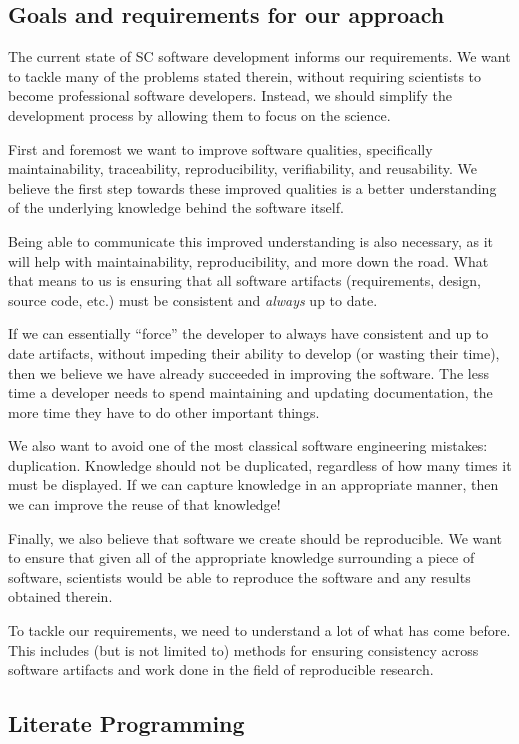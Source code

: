 \documentclass[preprint, 10pt]{sigplanconf}
\begin{document}
\subsection{Goals and requirements for our approach}

The current state of SC software development informs our requirements. We want
to tackle many of the problems stated therein, without requiring scientists to
become professional software developers. Instead, we should simplify the
development process by allowing them to focus on the science.

First and foremost we want to improve software qualities, specifically
maintainability, traceability, reproducibility, verifiability, and reusability.
We believe the first step towards these improved qualities is a better
understanding of the underlying knowledge behind the software itself.

Being able to communicate this improved understanding is also necessary, as it
will help with maintainability, reproducibility, and more down the road. What
that means to us is ensuring that all software artifacts (requirements, design,
source code, etc.) must be consistent and \emph{always} up to date.

If we can essentially ``force'' the developer to always have consistent and up
to date artifacts, without impeding their ability to develop (or wasting their
time), then we believe we have already succeeded in improving the software. The
less time a developer needs to spend maintaining and updating documentation, the
more time they have to do other important things. 

We also want to avoid one of the most classical software engineering mistakes:
duplication. Knowledge should not be duplicated, regardless of how many times it
must be displayed. If we can capture knowledge in an appropriate manner, then we
can improve the reuse of that knowledge!

Finally, we also believe that software we create should be reproducible. We want
to ensure that given all of the appropriate knowledge surrounding a piece of
software, scientists would be able to reproduce the software and any results
obtained therein.

To tackle our requirements, we need to understand a lot of what has come before.
This includes (but is not limited to) methods for ensuring consistency across
software artifacts and work done in the field of reproducible research.

\subsection{Literate Programming}
\label{subsec:lp}
\end{document}
